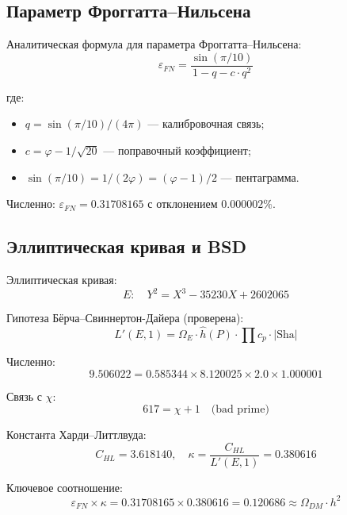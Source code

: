 \documentclass[12pt,a4paper,twoside]{article}
\newcommand{\EPS}{\varepsilon}
\theoremstyle{definition}
\begin{document}
\subsection{Параметр Фроггатта--Нильсена}

Аналитическая формула для параметра Фроггатта--Нильсена:
\begin{equation}
\boxed{
\EPS_{FN} = \frac{\sin(\pi/10)}{1 - q - c \cdot q^2}
}
\label{eq:epsilon}
\end{equation}

где:
\begin{itemize}
    \item $q = \sin(\pi/10)/(4\pi)$ — калибровочная связь;
    \item $c = \varphi - 1/\sqrt{20}$ — поправочный коэффициент;
    \item $\sin(\pi/10) = 1/(2\varphi) = (\varphi - 1)/2$ — пентаграмма.
\end{itemize}

Численно: $\EPS_{FN} = 0.31708165$ с отклонением $0.000002\%$.

\subsection{Эллиптическая кривая и BSD}

Эллиптическая кривая:
\begin{equation}
E: \quad Y^2 = X^3 - 35230X + 2602065
\label{eq:curve}
\end{equation}

Гипотеза Бёрча--Свиннертон-Дайера (проверена):
\begin{equation}
L'(E, 1) = \Omega_E \cdot \hat{h}(P) \cdot \prod c_p \cdot |\text{Sha}|
\label{eq:bsd}
\end{equation}

Численно:
\begin{equation}
9.506022 = 0.585344 \times 8.120025 \times 2.0 \times 1.000001
\end{equation}

Связь с $\chi$:
\begin{equation}
617 = \chi + 1 \quad \text{(bad prime)}
\end{equation}

Константа Харди--Литтлвуда:
\begin{equation}
C_{HL} = 3.618140, \quad \kappa = \frac{C_{HL}}{L'(E,1)} = 0.380616
\end{equation}

Ключевое соотношение:
\begin{equation}
\EPS_{FN} \times \kappa = 0.31708165 \times 0.380616 = 0.120686 \approx \Omega_{DM} \cdot h^2
\label{eq:dark_matter_relation}
\end{equation}
\end{document}
